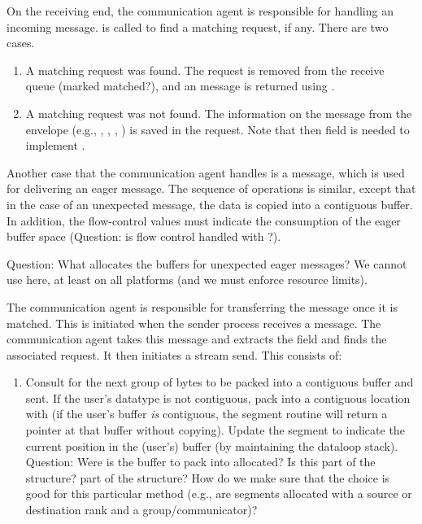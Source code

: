 \begin{mmadi}
\begin{tcp}
On the receiving end, the communication agent is responsible for handling an
incoming  message.  
 is called to find a matching request, if
any.  There are two cases.
\begin{enumerate}
\item A matching request was found.  The request is removed from the receive
  queue (marked matched?), and an  message is
  returned using .
\item A matching request was not found.  The information on the message from
  the envelope (e.g., ,
  ,
  ,
  ) is saved in the request.  Note
  that then  field is needed to
  implement . 
\end{enumerate}

Another case that the communication agent handles is a
 message, which is used for delivering an eager
message. 
The sequence of operations is similar, except that in the case of an
unexpected message, the data is copied into a contiguous buffer.  In addition,
the flow-control values must indicate the consumption of the eager buffer
space (Question: is flow control handled with ?).  

Question: What allocates the buffers for unexpected eager messages?  We cannot
use  here, at least on all platforms (and we must enforce
resource limits).


The communication agent is responsible for transferring the message once it is
matched.  This is initiated when the sender process receives a
 message.
The communication agent takes this message and extracts the
 field and finds the associated
request.  It then initiates a stream send.  This consists of:
\begin{enumerate}
\item Consult  for the next group of bytes
  to be packed into a contiguous buffer and sent.  If the user's datatype is
  not contiguous, pack into a contiguous 
  location with  (if the user's buffer \emph{is}
  contiguous, the segment routine will return a pointer at that buffer without
  copying).  Update the segment to indicate the
  current position in the (user's) buffer (by maintaining the dataloop
  stack). 
  Question: Were is the buffer to pack into allocated?  Is this part of the 
   structure?  part of the 
  structure? How do we make sure that the choice is
  good for this particular method (e.g., are segments allocated with a source
  or destination rank and a group/communicator)?


\end{enumerate}
\end{tcp}
\end{mmadi}
